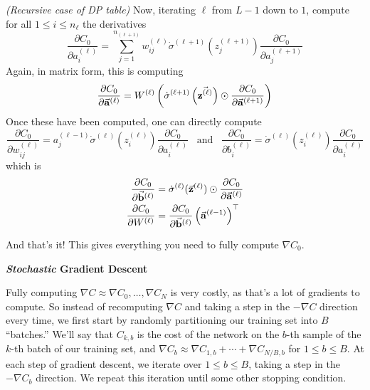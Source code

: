 \emph{(Recursive case of DP table)} Now, iterating $\ell$ from $L - 1$ down to $1$, compute for all $1 \leq i \leq n_\ell$ the derivatives 
\[
    \frac{\partial C_0}{\partial a_i^{(\ell)}} = \sum_{j = 1}^{n_{(\ell + 1)}} w_{ij}^{(\ell)} \dot\sigma^{(\ell + 1)}(z_j^{(\ell + 1)}) \frac{\partial C_0}{\partial a_j^{(\ell + 1)}}
\]
Again, in matrix form, this is computing 
\[
    \frac{\partial C_0}{\partial \vec{\mathbf{a}}^{(\ell)}} = W^{(\ell)} \left(\dot\sigma^{(\ell + 1)}\left(\vec{\mathbf{z^{(\ell)}}}\right) \odot \frac{\partial C_0}{\partial \vec{\mathbf{a}}^{(\ell + 1)}}\right)
\]
Once these have been computed, one can directly compute
\[
    \frac{\partial C_0}{\partial w_{ij}^{(\ell)}} = a_j^{(\ell - 1)} \dot\sigma^{(\ell)}(z_i^{(\ell)}) \frac{\partial C_0}{\partial a_i^{(\ell)}} \;\;\; \text{and} \;\;\; \frac{\partial C_0}{\partial b_i^{(\ell)}} = \dot\sigma^{(\ell)}(z_i^{(\ell)}) \frac{\partial C_0}{\partial a_i^{(\ell)}}
\]
which is 
\begin{align*}
    \frac{\partial C_0}{\partial \vec{\mathbf{b}}^{(\ell)}} &= \dot\sigma^{(\ell)}(\vec{\mathbf{z}}^{(\ell)}) \odot \frac{\partial C_0}{\partial \vec{\mathbf{a}}^{(\ell)}} \\
    \frac{\partial C_0}{\partial W^{(\ell)}}        &= \frac{\partial C_0}{\partial \vec{\mathbf{b}}^{(\ell)}} \left(\vec{\mathbf{a}}^{(\ell - 1)}\right)^\top
\end{align*}

And that's it! This gives everything you need to fully compute $\nabla C_0$.

\begin{center}
    \textbf{\emph{Stochastic} Gradient Descent}
\end{center}

Fully computing $\nabla C \approx \nabla C_0, \ldots, \nabla C_N$ is very costly, as that's a lot of gradients to compute. So instead 
of recomputing $\nabla C$ and taking a step in the $-\nabla C$ direction every time, we first start by randomly partitioning 
our training set into $B$ ``batches.'' We'll say that $C_{k, b}$ is the cost of the network on the $b$-th sample of the $k$-th 
batch of our training set, and $\nabla C_b \approx \nabla C_{1, b} + \cdots + \nabla C_{N/B, b}$ for $1 \leq b \leq B$. 
At each step of gradient descent, we iterate over $1 \leq b \leq B$, taking a step in the $-\nabla C_b$ direction. 
We repeat this iteration until some other stopping condition.